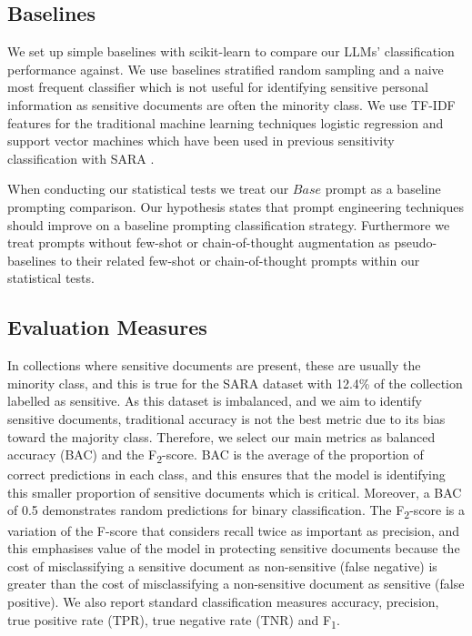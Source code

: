 \subsection{Baselines}
We set up simple baselines with scikit-learn \cite{pedregosa2011scikit} to compare our LLMs’ classification performance against. We use baselines stratified random sampling and a naive most frequent classifier which is not useful for identifying sensitive personal information as sensitive documents are often the minority class. We use TF-IDF features for the traditional machine learning techniques logistic regression and support vector machines which have been used in previous sensitivity classification with SARA \cite{mckechnie2024sara}.

When conducting our statistical tests we treat our $Base$ prompt as a baseline prompting comparison. Our hypothesis states that prompt engineering techniques should improve on a baseline prompting classification strategy. Furthermore we treat prompts without few-shot or chain-of-thought augmentation as pseudo-baselines to their related few-shot or chain-of-thought prompts within our statistical tests.

\subsection{Evaluation Measures}
In collections where sensitive documents are present, these are usually the minority class, and this is true for the SARA dataset with 12.4\% of the collection labelled as sensitive. As this dataset is imbalanced, and we aim to identify sensitive documents, traditional accuracy is not the best metric due to its bias toward the majority class. Therefore, we select our main metrics as balanced accuracy (BAC) and the F\textsubscript{2}-score. BAC is the average of the proportion of correct predictions in each class, and this ensures that the model is identifying this smaller proportion of sensitive documents which is critical. Moreover, a BAC of 0.5 demonstrates random predictions for binary classification. The F\textsubscript{2}-score is a variation of the F-score that considers recall twice as important as precision, and this emphasises value of the model in protecting sensitive documents because the cost of misclassifying a sensitive document as non-sensitive (false negative) is greater than the cost of misclassifying a non-sensitive document as sensitive (false positive). We also report standard classification measures accuracy, precision, true positive rate (TPR), true negative rate (TNR) and F\textsubscript{1}.

